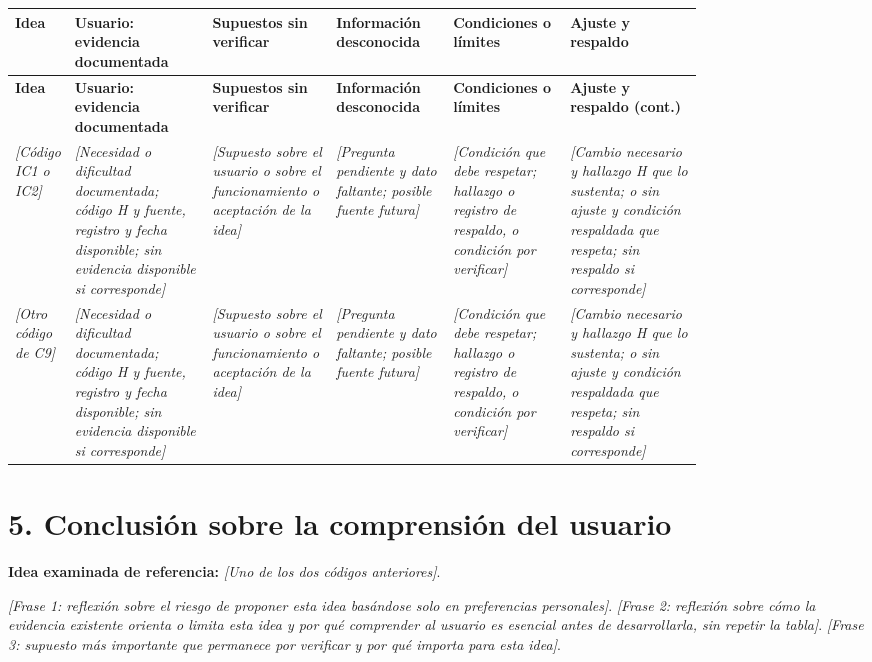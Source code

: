 \documentclass[12pt,a4paper]{article}
\newcommand{\campo}[1]{\textcolor{InstructionColor}{\textit{[#1]}}}
\begin{document}
{\footnotesize
\setlength{\tabcolsep}{3pt}
\begin{longtable}{|P{0.08\linewidth}|P{0.20\linewidth}|P{0.18\linewidth}|P{0.17\linewidth}|P{0.17\linewidth}|P{\arrayrulewidth\relax}|}
\hline
\textbf{Idea} & \textbf{Usuario: evidencia documentada} & \textbf{Supuestos sin verificar} & \textbf{Información desconocida} & \textbf{Condiciones o límites} & \textbf{Ajuste y respaldo} \\\hline
\endfirsthead
\hline
\textbf{Idea} & \textbf{Usuario: evidencia documentada} & \textbf{Supuestos sin verificar} & \textbf{Información desconocida} & \textbf{Condiciones o límites} & \textbf{Ajuste y respaldo (cont.)} \\\hline
\endhead
\campo{Código IC1 o IC2} & \campo{Necesidad o dificultad documentada; código H y fuente, registro y fecha disponible; sin evidencia disponible si corresponde} & \campo{Supuesto sobre el usuario o sobre el funcionamiento o aceptación de la idea} & \campo{Pregunta pendiente y dato faltante; posible fuente futura} & \campo{Condición que debe respetar; hallazgo o registro de respaldo, o condición por verificar} & \campo{Cambio necesario y hallazgo H que lo sustenta; o sin ajuste y condición respaldada que respeta; sin respaldo si corresponde} \\\hline
\campo{Otro código de C9} & \campo{Necesidad o dificultad documentada; código H y fuente, registro y fecha disponible; sin evidencia disponible si corresponde} & \campo{Supuesto sobre el usuario o sobre el funcionamiento o aceptación de la idea} & \campo{Pregunta pendiente y dato faltante; posible fuente futura} & \campo{Condición que debe respetar; hallazgo o registro de respaldo, o condición por verificar} & \campo{Cambio necesario y hallazgo H que lo sustenta; o sin ajuste y condición respaldada que respeta; sin respaldo si corresponde} \\\hline
\end{longtable}
}

\section*{5. Conclusión sobre la comprensión del usuario}
\textbf{Idea examinada de referencia:} \campo{Uno de los dos códigos anteriores}.

\campo{Frase 1: reflexión sobre el riesgo de proponer esta idea basándose solo en preferencias personales}.
\campo{Frase 2: reflexión sobre cómo la evidencia existente orienta o limita esta idea y por qué comprender al usuario es esencial antes de desarrollarla, sin repetir la tabla}.
\campo{Frase 3: supuesto más importante que permanece por verificar y por qué importa para esta idea}.
\end{document}
